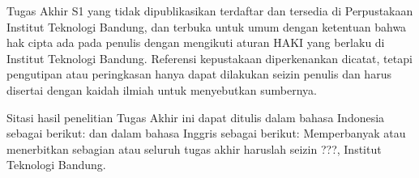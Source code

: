 \begin{pedoman}
\noindent Tugas Akhir S1 yang tidak dipublikasikan terdaftar dan tersedia di Perpustakaan Institut Teknologi Bandung, dan terbuka untuk umum dengan ketentuan bahwa hak cipta ada pada penulis dengan mengikuti aturan HAKI yang berlaku di Institut Teknologi Bandung. Referensi kepustakaan diperkenankan dicatat, tetapi pengutipan atau peringkasan hanya dapat dilakukan seizin penulis dan harus disertai dengan kaidah ilmiah untuk menyebutkan sumbernya.

\noindent Sitasi hasil penelitian Tugas Akhir ini dapat ditulis dalam bahasa Indonesia sebagai
berikut:
\sitasisaya
dan dalam bahasa Inggris sebagai berikut:
\mycitation
\noindent Memperbanyak atau menerbitkan sebagian atau seluruh tugas akhir haruslah seizin ???, Institut Teknologi Bandung.
\end{pedoman}
